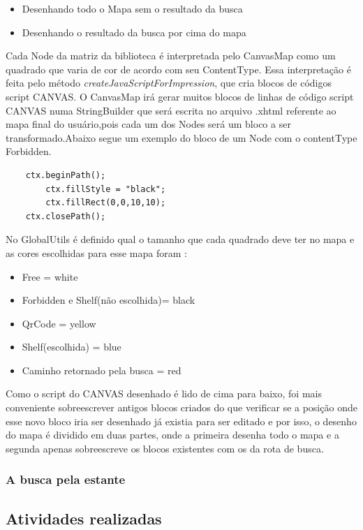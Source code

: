 \documentclass[a4paper,10pt]{article}
\begin{document}
\begin{itemize}	
	\item{ Desenhando todo o Mapa sem o resultado da busca}

	\item{ Desenhando o resultado da busca por cima do mapa}\\	
\end{itemize}
	Cada Node da matriz da biblioteca é interpretada pelo CanvasMap como um quadrado que varia de cor de acordo com seu ContentType.
	Essa interpretação é feita pelo método {\it createJavaScriptForImpression}, que cria blocos de códigos script CANVAS.
	O CanvasMap irá gerar muitos blocos de linhas de código script CANVAS numa StringBuilder que será escrita no arquivo .xhtml referente 
	ao mapa final do usuário,pois cada um dos Nodes será um bloco a ser transformado.Abaixo segue um exemplo do bloco de um Node com o 
	contentType Forbidden.\\
      \begin{lstlisting}	
	ctx.beginPath();
		ctx.fillStyle = "black";
		ctx.fillRect(0,0,10,10);
	ctx.closePath();
      \end{lstlisting}					

	No GlobalUtils é definido qual o tamanho que cada quadrado deve ter no mapa e as cores escolhidas para esse mapa foram :

\begin{itemize}	
	\item{ Free = white}
	\item{ Forbidden e Shelf(não escolhida)= black}
	\item{ QrCode = yellow }
	\item{ Shelf(escolhida) = blue}
	\item{ Caminho retornado pela busca = red}
\end{itemize}
	Como o script do CANVAS desenhado é lido de cima para baixo, foi mais conveniente sobreescrever antigos blocos criados do que
	verificar se a posição onde esse novo bloco iria ser desenhado já existia para ser editado e por isso, o desenho do mapa é dividido em duas partes, onde a
	primeira desenha todo o mapa e a segunda apenas sobreescreve os blocos existentes com os da rota de busca.  
	
	  
	\subsubsection{A busca pela estante}
   \subsection{Atividades realizadas}
	
\end{document}
